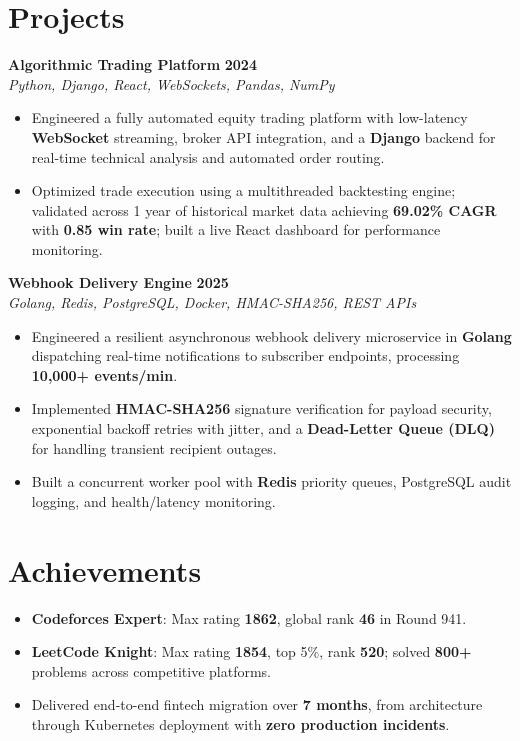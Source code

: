 \documentclass[a4paper,11pt]{article}
\begin{document}
\section*{Projects}
\textbf{Algorithmic Trading Platform} \hfill \textbf{2024} \\
{\small\textit{Python, Django, React, WebSockets, Pandas, NumPy}}\par\vspace{1.5pt}
\begin{itemize}
 \item Engineered a fully automated equity trading platform with low-latency \textbf{WebSocket} streaming, broker API integration, and a \textbf{Django} backend for real-time technical analysis and automated order routing.
 \item Optimized trade execution using a multithreaded backtesting engine; validated across 1 year of historical market data achieving \textbf{69.02\% CAGR} with \textbf{0.85 win rate}; built a live React dashboard for performance monitoring.
\end{itemize}

\vspace{6.5pt}
\textbf{Webhook Delivery Engine} \hfill \textbf{2025} \\
{\small\textit{Golang, Redis, PostgreSQL, Docker, HMAC-SHA256, REST APIs}}\par\vspace{1.5pt}
\begin{itemize}
 \item Engineered a resilient asynchronous webhook delivery microservice in \textbf{Golang} dispatching real-time notifications to subscriber endpoints, processing \textbf{10,000+ events/min}.
 \item Implemented \textbf{HMAC-SHA256} signature verification for payload security, exponential backoff retries with jitter, and a \textbf{Dead-Letter Queue (DLQ)} for handling transient recipient outages.
 \item Built a concurrent worker pool with \textbf{Redis} priority queues, PostgreSQL audit logging, and health/latency monitoring.
\end{itemize}

\section*{Achievements}
\begin{itemize}
 \item \textbf{Codeforces Expert}: Max rating \textbf{1862}, global rank \textbf{46} in Round 941.
 \item \textbf{LeetCode Knight}: Max rating \textbf{1854}, top 5\%, rank \textbf{520}; solved \textbf{800+} problems across competitive platforms.
 \item Delivered end-to-end fintech migration over \textbf{7 months}, from architecture through Kubernetes deployment with \textbf{zero production incidents}.
\end{itemize}
\end{document}
